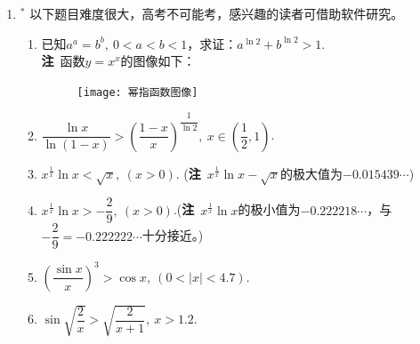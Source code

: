 \begin{enumerate}[label={\textbf{\arabic*.}},leftmargin=
    \inteval{\myenumleftmargin}pt]
\item $ ^* $ 以下题目难度很大，高考不可能考，感兴趣的读者可借助软件研究。
\begin{enumerate}[label={(\arabic*)},itemsep=-1pt]
\item 已知$ a^a=b^b,\ 0<a<b<1 $，求证：$ a^{\ln 2}+b^{\ln2}>1 $. \\
\textbf{注}\ 函数$ y=x^x $的图像如下：
\begin{figure}[!htbp]
    \centering
    \texttt{[image: 幂指函数图像]}
\end{figure} 
\item $ \dfrac{\ln x}{\ln(1-x)}>\left(\dfrac{1-x}{x}\right)^{
    \dfrac{1}{\ln 2}},\ x\in\left(\dfrac{1}{2},1\right) $. 
\item $ x^{\frac{1}{x}}\ln x<\sqrt{x},\ (x>0) $. (\textbf{注}\ 
$ x^{\frac{1}{x}}\ln x-\sqrt{x} $的极大值为$ -0.015439\cdots $) 
\item $ x^{\frac{1}{x}}\ln x >-\dfrac{2}{9},\ (x>0) $.(\textbf{注}\ 
$ x^{\frac{1}{x}}\ln x $的极小值为$ -0.222218\cdots $，与
$ -\dfrac{2}{9}=-0.222222\cdots $十分接近。) 
\item $ \left(\dfrac{\sin x}{x}\right)^3>\cos x,\ (0<|x|<4.7) $.
\item $ \sin\sqrt{\dfrac{2}{x}}>\sqrt{\dfrac{2}{x+1}},\ x>1.2 $.
\end{enumerate}


\end{enumerate}
\myfootnote{\CopyrightStatementChap}
\cleardoublepage



